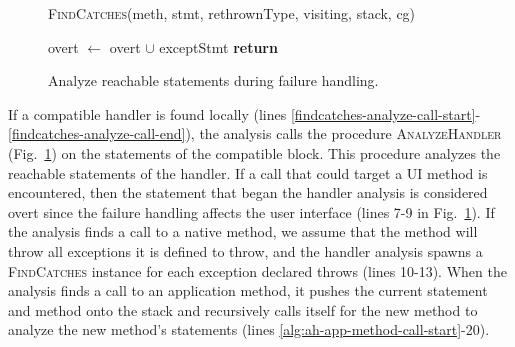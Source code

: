 \begin{figure}[t]
\begin{algorithmic}[1]
\EndFor \label{alg:calc-rethrow-types-end}

\label{alg:findcatches-rethrown-line}
\State \textsc{FindCatches}(meth, stmt, rethrownType, visiting, stack,
cg)

\label{alg:progagate-line}
\State overt $\gets$ overt $\cup$ exceptStmt
\State \textbf{return}
\EndIf
\EndFor
\label{alg:found-throws-end}
\EndIf

\EndFor

\EndProcedure
\end{algorithmic}
\caption{Analyze reachable statements during failure handling.}\label{alg:analyzehandler}
\vspace{-0.1in}
\end{figure}

If a compatible handler is found locally (lines
\ref{findcatches-analyze-call-start}-\ref{findcatches-analyze-call-end}),
the analysis calls the procedure \textsc{AnalyzeHandler}
(Fig.~\ref{alg:analyzehandler}) on the statements of the compatible
block.  This procedure analyzes the reachable statements of the
handler. If a call that could target a UI method is encountered, then
the statement that began the handler analysis is considered overt
since the failure handling affects the user interface
(lines 7-9 in Fig.~\ref{alg:analyzehandler}). %
If the analysis finds a call to a
native method, we assume that the method will throw all exceptions it
is defined to throw, and the handler analysis spawns a
\textsc{FindCatches} instance for each exception declared throws
(lines 10-13). %
When the analysis finds a call to
an application method, it pushes the current statement and method onto
the stack and recursively calls itself for the new method to analyze
the new method's statements (lines
\ref{alg:ah-app-method-call-start}-20). %

